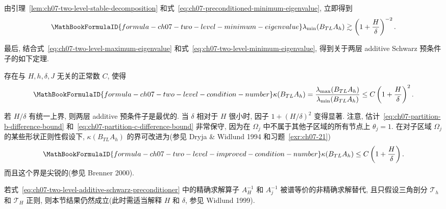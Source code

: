 由引理~\ref{lem:ch07-two-level-stable-decomposition} 和式~\eqref{eq:ch07-preconditioned-minimum-eigenvalue}, 立即得到
\begin{equation}
\MathBookFormulaID{formula-ch07-two-level-minimum-eigenvalue}
\label{eq:ch07-two-level-minimum-eigenvalue}
\lambda_{\min}(B_{TL}A_h)
\gtrsim\left(1+\frac{H}{\delta}\right)^{-2}.
\end{equation}

最后, 结合式~\eqref{eq:ch07-two-level-maximum-eigenvalue} 和式~\eqref{eq:ch07-two-level-minimum-eigenvalue}, 得到关于两层 additive Schwarz 预条件子的如下定理.

\begin{Theorem}
\label{thm:ch07-two-level-condition-number}
存在与 $H,h,\delta,J$ 无关的正常数 $C$, 使得
\[
\MathBookFormulaID{formula-ch07-two-level-condition-number}
\kappa(B_{TL}A_h)
=\frac{\lambda_{\max}(B_{TL}A_h)}{\lambda_{\min}(B_{TL}A_h)}
\leq C\left(1+\frac{H}{\delta}\right)^2.
\]
\end{Theorem}

\begin{Remark}
\label{rem:ch07-two-level-optimality}
若 $H/\delta$ 有统一上界, 则两层 additive 预条件子是最优的. 当 $\delta$ 相对于 $H$ 很小时, 因子 $1+(H/\delta)^2$ 变得显著. 注意, 估计~\eqref{eq:ch07-partition-b-difference-bound} 和~\eqref{eq:ch07-partition-c-difference-bound} 非常保守, 因为在 $\Omega_j$ 中不属于其他子区域的所有节点上 $\theta_j=1$. 在对子区域 $\Omega_j$ 的某些形状正则性假设下, $\kappa(B_{TL}A_h)$ 的界可改进为(参见 Dryja \& Widlund 1994 和习题~\ref{exr:ch07-21})
\[
\MathBookFormulaID{formula-ch07-two-level-improved-condition-number}
\kappa(B_{TL}A_h)\leq C\left(1+\frac{H}{\delta}\right).
\]
而且这个界是尖锐的(参见 Brenner 2000).
\end{Remark}

\begin{Remark}
\label{rem:ch07-two-level-inexact-solves}
若式~\eqref{eq:ch07-two-level-additive-schwarz-preconditioner} 中的精确求解算子 $A_H^{-1}$ 和 $A_j^{-1}$ 被谱等价的非精确求解替代, 且只假设三角剖分 $\mathcal T_h$ 和 $\mathcal T_H$ 正则, 则本节结果仍然成立(此时需适当解释 $H$ 和 $\delta$, 参见 Widlund 1999).
\end{Remark}

